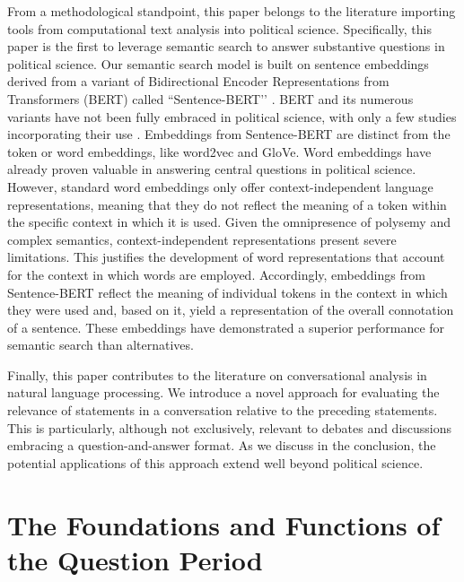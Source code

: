 {{From a methodological standpoint, this paper belongs to the literature importing tools from computational text analysis into political science. Specifically, this paper is the first to leverage semantic search to answer substantive questions in political science. Our semantic search model is built on sentence embeddings derived from a variant of Bidirectional Encoder Representations from Transformers (BERT) called ``Sentence-BERT’’ \citep{reimers2019sentencebert}. BERT and its numerous variants have not been fully embraced in political science, with only a few studies incorporating their use \citep{hu-etal-2022-conflibert, Wankmuller_2022, Bestvater_Monroe_2023, Uveges_Ring_2023, Wang_2023, Widmann_Wich_2023, Laurer_van_Atteveldt_Casas_Welbers_2024}. Embeddings from Sentence-BERT are distinct from the token or word embeddings, like word2vec and GloVe. Word embeddings have already proven valuable in answering central questions in political science. However, standard word embeddings only offer context-independent language representations, meaning that they do not reflect the meaning of a token within the specific context in which it is used. Given the omnipresence of polysemy and complex semantics, context-independent representations present severe limitations. This justifies the development of word representations that account for the context in which words are employed. Accordingly, embeddings from Sentence-BERT reflect the meaning of individual tokens in the context in which they were used and, based on it, yield a representation of the overall connotation of a sentence. These embeddings have demonstrated a superior performance for semantic search than alternatives.

Finally, this paper contributes to the literature on conversational analysis in natural language processing. We introduce a novel approach for evaluating the relevance of statements in a conversation relative to the preceding statements. This is particularly, although not exclusively, relevant to debates and discussions embracing a question-and-answer format. As we discuss in the conclusion, the potential applications of this approach extend well beyond political science.

\section*{The Foundations and Functions of the Question Period}

}}
